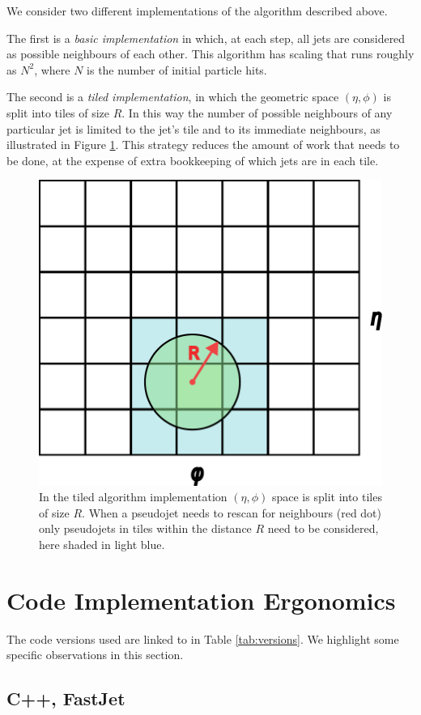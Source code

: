 \documentclass{webofc}
\begin{document}
We consider two different implementations of the algorithm described above. 

The first is a \emph{basic implementation} in which, at each step, all jets are
considered as possible neighbours of each other. This algorithm has scaling that
runs roughly as $N^2$, where $N$ is the number of initial particle hits.

The second is a \emph{tiled implementation}, in which the geometric space
$(\eta, \phi)$ is split into tiles of size $R$. In this way the number of
possible neighbours of any particular jet is limited to the jet's tile and to
its immediate neighbours, as illustrated in Figure \ref{fig:tiledimp}. This
strategy reduces the amount of work that needs to be done, at the expense of
extra bookkeeping of which jets are in each tile.

\begin{figure}[h]
  \begin{center}
    \includegraphics[width=0.5\linewidth]{tiled-algorithm.pdf}
    \caption{In the tiled algorithm implementation $(\eta,\phi)$ space is split into tiles of size $R$. When a pseudojet needs to rescan for neighbours (red dot) only pseudojets in tiles within the distance $R$ need to be considered, here shaded in light blue.}
    \label{fig:tiledimp}
  \end{center}
\end{figure}

\section{Code Implementation Ergonomics}
\label{sec:ergonomics}

The code versions used are linked to in Table \ref{tab:versions}. We highlight
some specific observations in this section.

\subsection{C++, FastJet}
\label{sec:cpp-ergonomics}
\end{document}
